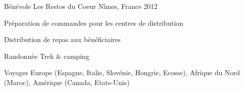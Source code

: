 

\begin{cventries}

  \cventry
    {Bénévole} %
    {Les Restos du Coeur} %
    {Nîmes, France} %
    {2012} %
    {
      \begin{cvitems} %
        \item {Préparation de commandes pour les centres de distribution}
        \item {Distribution de repas aux bénéficiaires}
      \end{cvitems}
    }

\end{cventries}


\begin{cvhonors}

  \cvhonor
    {Randonnée} %
    {Trek \& camping} %
    {} %
    {} %

  \cvhonor
    {Voyages} %
    {Europe (Espagne, Italie, Slovénie, Hongrie, Ecosse), Afrique du Nord (Maroc), Amérique (Canada, Etats-Unis)} %
    {} %
    {} %
\end{cvhonors}
